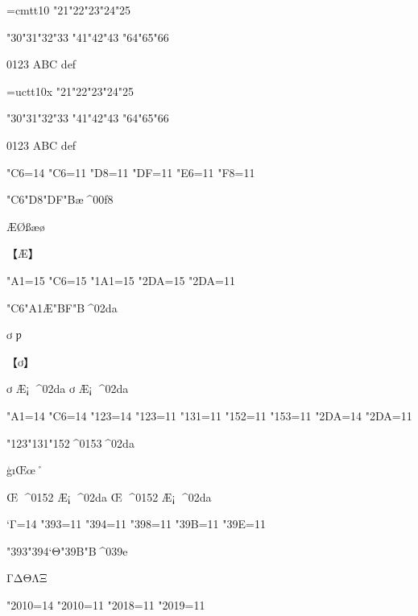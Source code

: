 %
\ifx\fmtname\undefined
  
  \def\fmtname{basic}
  \expandafter\dump
\fi
\begingroup %
\font\cmtt=cmtt10
\cmtt
\char"21\char"22\char"23\char"24\char"25

\char"30\char"31\char"32\char"33 \char"41\char"42\char"43 \char"64\char"65\char"66

0123 ABC def


\font\uctt=uctt10x
\uctt
\char"21\char"22\char"23\char"24\char"25

\char"30\char"31\char"32\char"33 \char"41\char"42\char"43 \char"64\char"65\char"66

0123 ABC def


\kcatcode"C6=14 %
\catcode"C6=11  \catcode"D8=11  \catcode"DF=11
\catcode"E6=11  \catcode"F8=11

\char"C6\Uchar"D8\Ucharcat"DF"B^^e6^^^^00f8

ÆØßæø

\hbox{【Æ】}

\kcatcode"A1=15 %
\kcatcode"C6=15
\kcatcode"1A1=15
\kcatcode"2DA=15
\catcode"2DA=11

\char"C6\Uchar"A1^^c6\Ucharcat"BF"B^^^^02da

ơ%
ƿ%

\hbox{【ơ】}

\def\AAA{ơ ^^c6^^a1 ^^^^02da}\AAA
\edef\mAAA{\meaning\AAA}\mAAA

\kcatcode"A1=14
\kcatcode"C6=14
\kcatcode"123=14
\catcode"123=11  \catcode"131=11  \catcode"152=11
\catcode"153=11
\kcatcode"2DA=14
\catcode"2DA=11

\char"123\char"131\Uchar"152^^^^0153^^^^02da

ģıŒœ˚

\def\AAA{Œ ^^^^0152 ^^c6^^a1 ^^^^02da}\AAA
\edef\mAAA{\meaning\AAA}\mAAA

\kcatcode`Γ=14 %
\catcode"393=11  \catcode"394=11  \catcode"398=11
\catcode"39B=11  \catcode"39E=11

\char"393\Uchar"394\char`Θ\Ucharcat"39B"B^^^^039e

ΓΔΘΛΞ

\kcatcode"2010=14
\catcode"2010=11  \catcode"2018=11  \catcode"2019=11

